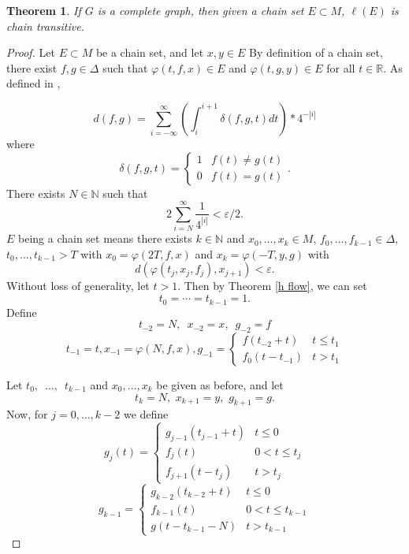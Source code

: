 \documentclass[11pt]{article}
\newtheorem{thm}{Theorem}
\begin{document}
\begin{thm}\label{chain set lift}
If $G$ is a complete graph, then given a chain set $E\subset M$, $\ell(E)$ is chain transitive.
\end{thm}
\begin{proof}
 Let $E\subset M$ be a chain set, and let $x,y\in E$  By definition of a chain set, there exist $f,g\in\Delta$ such that $\varphi(t,f,x)\in E$ and $\varphi(t,g,y)\in E$ for all $t\in\mathbb{R}$.  As defined in \cite{Ayers2013},

$$d(f,g)=\displaystyle\sum_{i=-\infty}^{\infty}\left(\displaystyle\int_{i}^{i+1}\delta(f,g,t)dt\right)*4^{-|i|}$$
 where
 $$\delta(f,g,t)=\left\{
     \begin{array}{lr}
       1 &  f(t)\not=g(t)\\
       0 &  f(t)=g(t)
     \end{array}
   \right. .$$
There exists $N\in\mathbb{N}$ such that 
$$2\displaystyle\sum_{i=N}^{\infty}\frac{1}{4^{|i|}}<\varepsilon/2.$$
$E$ being a chain set means there exists $k\in\mathbb{N}$ and $x_0,\ldots,x_k\in M$, $f_0,\ldots,f_{k-1}\in\Delta$, $t_0,\ldots,t_{k-1}>T$ with $x_0=\varphi(2T,f,x)$ and $x_k=\varphi(-T,y,g)$ with 
$$d(\varphi(t_j,x_j,f_j),x_{j+1})<\varepsilon.$$
Without loss of generality, let $t>1$.  Then by Theorem \ref{h flow}, we can set
$$t_0=\cdots=t_{k-1}=1.$$
Define
$$t_{-2}=N, \,\,\,x_{-2}=x, \,\,\,g_{-2}=f$$
$$t_{-1}=t,x_{-1}=\varphi(N,f,x), g_{-1}= \left\{
     \begin{array}{lr}
       f(t_{-2}+t) &  t\leq t_1\\
       f_0(t-t_{-1}) &  t>t_1
     \end{array}
   \right.$$

Let $t_0,\,\,\,\ldots,\,\,\,t_{k-1}$ and $x_0,\ldots,x_k$ be given as before, and let 
$$t_k=N, \,\,x_{k+1}=y,\,\,g_{k+1}=g.$$
Now, for $j=0,\ldots,k-2$ we define
$$g_j(t)=\left\{
     \begin{array}{lr}
      g_{j-1}(t_{j-1}+t) &  t\leq 0\\
       f_j(t) & 0<t\leq t_j\\
       f_{j+1}(t-t_j) & t>t_j
    
     \end{array}
   \right.$$
   $$g_{k-1}=\left\{
     \begin{array}{lr}
       g_{k-2}(t_{k-2}+t) & t\leq0\\
       f_{k-1}(t)&  0<t\leq t_{k-1}\\
       g(t-t_{k-1}-N) & t>t_{k-1}
     \end{array}
   \right.$$
   

\end{proof}
\end{document}
